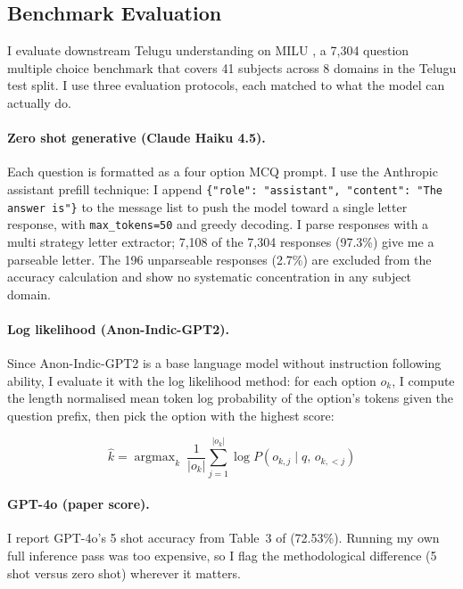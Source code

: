 ﻿\documentclass[11pt]{article}
\begin{document}
\subsection{Benchmark Evaluation}
\label{sec:benchmark}

I evaluate downstream Telugu understanding on MILU
\citep{verma-etal-2024-milu}, a 7,304 question multiple choice
benchmark that covers 41 subjects across 8 domains in the Telugu
test split. I use three evaluation protocols, each matched to what
the model can actually do.

\paragraph{Zero shot generative (Claude Haiku 4.5).}
Each question is formatted as a four option MCQ prompt. I use the
Anthropic assistant prefill technique: I append
\texttt{\small\{"role": "assistant", "content": "The answer is"\}}
to the message list to push the model toward a single letter
response, with \texttt{max\_tokens=50} and greedy decoding. I parse
responses with a multi strategy letter extractor; 7,108 of the
7,304 responses (97.3\%) give me a parseable letter. The 196
unparseable responses (2.7\%) are excluded from the accuracy
calculation and show no systematic concentration in any subject
domain.

\paragraph{Log likelihood (Anon-Indic-GPT2).}
Since Anon-Indic-GPT2 is a base language model without
instruction following ability, I evaluate it with the log
likelihood method: for each option $o_k$, I compute the length
normalised mean token log probability of the option's tokens given
the question prefix, then pick the option with the highest score:

\begin{equation}
    \hat{k} = \mathop{\arg\max}_{k}\
              \frac{1}{|o_k|}
              \sum_{j=1}^{|o_k|}
              \log P\!\left(o_{k,j} \mid q,\, o_{k,<j}\right)
    \label{eq:loglik}
\end{equation}

\paragraph{GPT-4o (paper score).}
I report GPT-4o's 5 shot accuracy from Table~3 of
\citet{verma-etal-2024-milu} (72.53\%). Running my own full
inference pass was too expensive, so I flag the methodological
difference (5 shot versus zero shot) wherever it matters.
\end{document}
